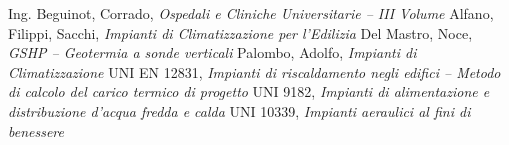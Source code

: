 \begin{thebibliography}{9}
	Ing. Beguinot, Corrado, \emph{Ospedali e Cliniche Universitarie -- \emph{III Volume}}
	Alfano, Filippi, Sacchi, \emph{Impianti di Climatizzazione per l'Edilizia}
	Del Mastro, Noce, \emph{GSHP -- \emph{Geotermia a sonde verticali}}
	Palombo, Adolfo, \emph{Impianti di Climatizzazione}
	 UNI EN 12831, \emph{Impianti di riscaldamento negli edifici -- \emph{Metodo di calcolo del carico termico di progetto}}
	 UNI 9182, \emph{Impianti di alimentazione e distribuzione d'acqua fredda e calda}
	 UNI 10339, \emph{Impianti aeraulici al fini di benessere}
\end{thebibliography}
\thispagestyle{empty}